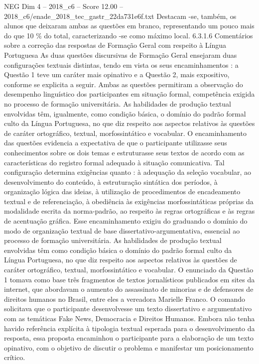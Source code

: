 \begin{textsample}{NEG Dim 4 – 2018\_c6 – Score 12.00 – 2018\_c6/enade\_2018\_tec\_gastr\_22da731e6f.txt}
Destacam -se, também, os alunos que deixaram ambas as questões em branco, representando um pouco mais do que 10 \% do total, caracterizando -se como máximo local. 6.3.1.6 Comentários sobre a correção das respostas de Formação Geral com respeito à Língua Portuguesa As duas questões discursivas de Formação Geral ensejaram duas configurações textuais distintas, tendo em vista os seus encaminhamentos : a Questão 1 teve um caráter mais opinativo e a Questão 2, mais expositivo, conforme se explicita a seguir.
Ambas as questões permitiram a observação do desempenho linguístico dos participantes em situação formal, competência exigida no processo de formação universitária.
As habilidades de produção textual envolvidas têm, igualmente, como condição básica, o domínio do padrão formal culto da Língua Portuguesa, no que diz respeito aos aspectos relativos às questões de caráter ortográfico, textual, morfossintático e vocabular.
O encaminhamento das questões evidencia a expectativa de que o participante utilizasse seus conhecimentos sobre os dois temas e estruturasse seus textos de acordo com as características do registro formal adequado à situação comunicativa.
Tal configuração determina exigências quanto : à adequação da seleção vocabular, ao desenvolvimento do conteúdo, à estruturação sintática dos períodos, à organização lógica das ideias, à utilização de procedimentos de encadeamento textual e de referenciação, à obediência às exigências morfossintáticas próprias da modalidade escrita da norma-padrão, ao respeito às regras ortográficas e às regras de acentuação gráfica.
Esse encaminhamento exigiu do graduando o domínio do modo de organização textual de base dissertativo-argumentativa, essencial ao processo de formação universitária.
As habilidades de produção textual envolvidas têm como condição básica o domínio do padrão formal culto da Língua Portuguesa, no que diz respeito aos aspectos relativos às questões de caráter ortográfico, textual, morfossintático e vocabular.
O enunciado da Questão 1 tomava como base três fragmentos de textos jornalísticos publicados em sites da internet, que abordavam o aumento do assassinato de minorias e de defensores de direitos humanos no Brasil, entre eles a vereadora Marielle Franco.
O comando solicitava que o participante desenvolvesse um texto dissertativo e argumentativo com as temáticas Fake News, Democracia e Direitos Humanos.
Embora não tenha havido referência explícita à tipologia textual esperada para o desenvolvimento da resposta, essa proposta encaminhou o participante para a elaboração de um texto opinativo, com o objetivo de discutir o problema e manifestar um posicionamento crítico.

\end{textsample}
